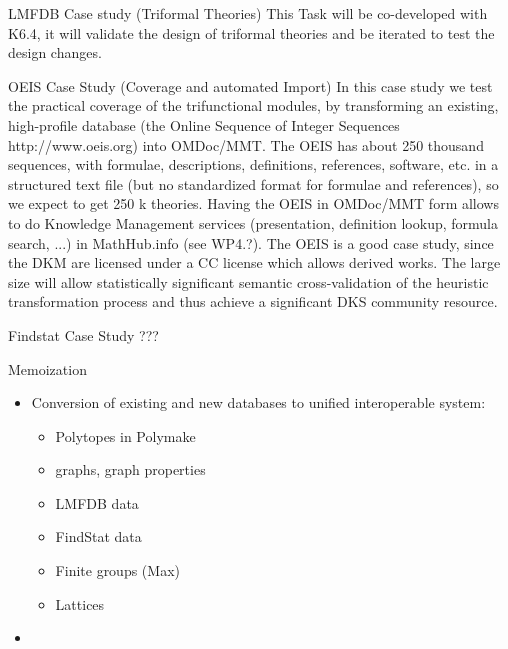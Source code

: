 \begin{Workpackage}{\thewpno}
\begin{task}{LMFDB Case study (Triformal Theories)}
This Task will be co-developed with K6.4, it will validate the design of triformal theories and be iterated to test the design changes.
\end{task}


\begin{task}{OEIS Case Study (Coverage and automated Import)}
\label{task:data_OEIS}
In this case study we test the practical coverage of the trifunctional modules, by transforming an existing, high-profile database (the Online Sequence of Integer Sequences http://www.oeis.org) into OMDoc/MMT. The OEIS has about 250 thousand sequences, with formulae, descriptions, definitions, references, software, etc. in a structured text file (but no standardized format for formulae and references), so we expect to get 250 k theories. Having the OEIS in OMDoc/MMT form allows to do Knowledge Management services (presentation, definition lookup, formula search, ...) in MathHub.info (see WP4.?). The OEIS is a good case study, since the DKM  are licensed under a CC license which allows derived works. The large size will allow statistically significant semantic cross-validation of the heuristic transformation process and thus achieve a significant DKS community resource.
\end{task}

\begin{task}{Findstat Case Study ???}
\label{task:data_findstat}

\end{task}

\begin{task}{Memoization}
\label{task:data_memo}

\end{task}

\begin{WPDeliverables}
\begin{itemize}
\item Conversion of existing and new databases to unified interoperable system:
  \begin{itemize}
  \item Polytopes in Polymake
  \item graphs, graph properties
  \item LMFDB data
  \item FindStat data
  \item Finite groups (Max)
  \item Lattices
  \end{itemize}
  
\item {}


\end{itemize}
\end{WPDeliverables}
\end{Workpackage}
